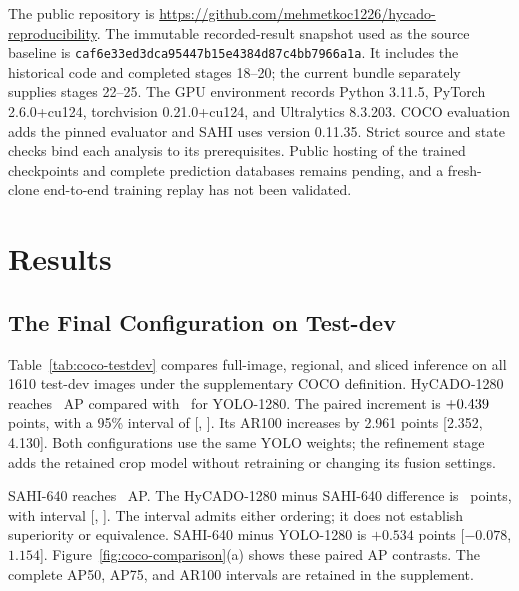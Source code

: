 \documentclass[journal]{IEEEtran}
\begin{document}
The public repository is \url{https://github.com/mehmetkoc1226/hycado-reproducibility}. The immutable recorded-result snapshot used as the source baseline is \texttt{caf6e33ed3dca95447b15e4384d87c4bb7966a1a}. It includes the historical code and completed stages 18--20; the current bundle separately supplies stages 22--25. The GPU environment records Python 3.11.5, PyTorch 2.6.0+cu124, torchvision 0.21.0+cu124, and Ultralytics 8.3.203. COCO evaluation adds the pinned evaluator and SAHI uses version 0.11.35. Strict source and state checks bind each analysis to its prerequisites. Public hosting of the trained checkpoints and complete prediction databases remains pending, and a fresh-clone end-to-end training replay has not been validated.

\section{Results}
\subsection{The Final Configuration on Test-dev}
Table~\ref{tab:coco-testdev} compares full-image, regional, and sliced inference on all 1610 test-dev images under the supplementary COCO definition. HyCADO-1280 reaches \CocoH\ AP compared with \CocoY\ for YOLO-1280. The paired increment is $+0.439$ points, with a 95\% interval of [\CocoHYLow, \CocoHYHigh]. Its AR100 increases by 2.961 points [2.352, 4.130]. Both configurations use the same YOLO weights; the refinement stage adds the retained crop model without retraining or changing its fusion settings.

\begin{table}[t]
\caption{COCO-style accuracy on 1610 VisDrone DET test-dev images, with the stated ignore-region preprocessing and maxDets100 per category. All values are on a 0--100 scale. SAHI-640 denotes 640-pixel slices with the same YOLO checkpoint and a model input target of 800; it includes the standard full-image pass. The 800-region variant uses YOLO-1280 for final global predictions.}
\label{tab:coco-testdev}
\centering\small\setlength{\tabcolsep}{4.8pt}
\end{table}

SAHI-640 reaches \CocoS\ AP. The HyCADO-1280 minus SAHI-640 difference is \CocoHS\ points, with interval [\CocoHSLow, \CocoHSHigh]. The interval admits either ordering; it does not establish superiority or equivalence. SAHI-640 minus YOLO-1280 is $+0.534$ points [$-0.078$, $1.154$]. Figure~\ref{fig:coco-comparison}(a) shows these paired AP contrasts. The complete AP50, AP75, and AR100 intervals are retained in the supplement.
\end{document}
